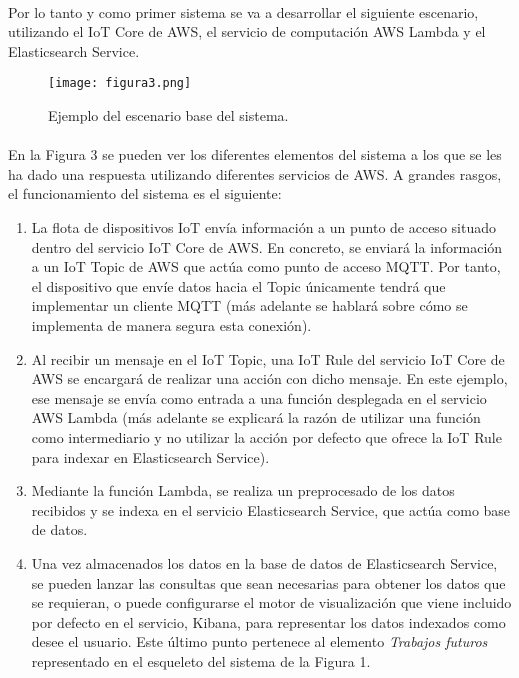 \documentclass[../../memoria.tex]{subfiles}
\begin{document}
\paragraph{}
Por lo tanto y como primer sistema se va a desarrollar el siguiente escenario, utilizando el IoT Core de AWS, el servicio de computación AWS Lambda y el Elasticsearch Service.

\begin{figure}[H]
    \centering
    \texttt{[image: figura3.png]}
    \caption{Ejemplo del escenario base del sistema.}
    \label{fig:figura3}
\end{figure}

\paragraph{}
En la Figura 3 se pueden ver los diferentes elementos del sistema a los que se les ha dado una respuesta utilizando diferentes servicios de AWS. A grandes rasgos, el funcionamiento del sistema es el siguiente:

\begin{enumerate}
    \item La flota de dispositivos IoT envía información a un punto de acceso situado dentro del servicio IoT Core de AWS. En concreto, se enviará la información a un IoT Topic de AWS que actúa como punto de acceso MQTT\cite{mqtt}. Por tanto, el dispositivo que envíe datos hacia el Topic únicamente tendrá que implementar un cliente MQTT (más adelante se hablará sobre cómo se implementa de manera segura esta conexión).

    \item Al recibir un mensaje en el IoT Topic, una IoT Rule del servicio IoT Core de AWS se encargará de realizar una acción con dicho mensaje. En este ejemplo, ese mensaje se envía como entrada a una función desplegada en el servicio AWS Lambda (más adelante se explicará la razón de utilizar una función como intermediario y no utilizar la acción por defecto que ofrece la IoT Rule para indexar en Elasticsearch Service).

    \item Mediante la función Lambda, se realiza un preprocesado de los datos recibidos y se indexa en el servicio Elasticsearch Service, que actúa como base de datos.

    \item Una vez almacenados los datos en la base de datos de Elasticsearch Service, se pueden lanzar las consultas que sean necesarias para obtener los datos que se requieran, o puede configurarse el motor de visualización que viene incluido por defecto en el servicio, Kibana, para representar los datos indexados como desee el usuario. Este último punto pertenece al elemento \textit{Trabajos futuros} representado en el esqueleto del sistema de la Figura 1.
\end{enumerate}
\end{document}
